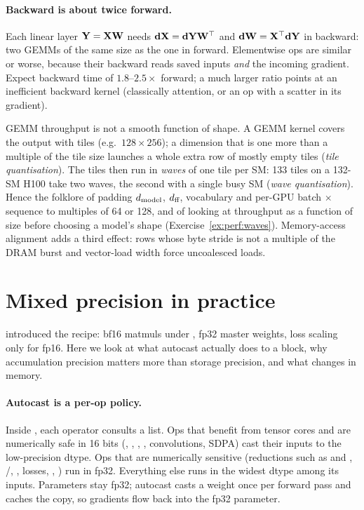 \paragraph{Backward is about twice forward.} Each linear layer $\mathbf{Y}=\mathbf{X}\mathbf{W}$ needs
$\mathbf{dX}=\mathbf{dY}\mathbf{W}^\top$ and $\mathbf{dW}=\mathbf{X}^\top\mathbf{dY}$ in backward: two GEMMs of the
same size as the one in forward. Elementwise ops are similar or worse, because their backward
reads saved inputs \emph{and} the incoming gradient. Expect backward time of
$1.8$--$2.5\times$ forward; a much larger ratio points at an inefficient backward kernel (classically
attention, or an op with a scatter in its gradient).

\begin{systemslens}
GEMM throughput is not a smooth function of shape. A GEMM kernel covers the output with tiles
(e.g.\ $128\times256$); a dimension that is one more than a multiple of the tile size launches a
whole extra row of mostly empty tiles (\emph{tile quantisation}). The tiles then run in
\emph{waves} of one tile per SM: 133 tiles on a 132-SM H100 take two waves, the second with a
single busy SM (\emph{wave quantisation}). Hence the folklore of padding $d_{\text{model}}$, $d_{\text{ff}}$,
vocabulary and per-GPU batch $\times$ sequence to multiples of 64 or 128, and of looking at
throughput as a function of size before choosing a model's shape (Exercise~\ref{ex:perf:waves}).
Memory-access alignment adds a third effect: rows whose byte stride is not a multiple of the
DRAM burst and vector-load width force uncoalesced loads.
\end{systemslens}

\section{Mixed precision in practice}\label{sec:perf:amp}

 introduced the recipe: bf16 matmuls under ,
fp32 master weights, loss scaling only for fp16. Here we look at what autocast actually does to
a block, why accumulation precision matters more than storage precision, and what changes in
memory.

\paragraph{Autocast is a per-op policy.} Inside , each
operator consults a list. Ops that benefit from tensor cores and are numerically safe in 16 bits
(, , , , convolutions, SDPA) cast their inputs to the
low-precision dtype. Ops that are numerically sensitive (reductions such as  and
, /, , losses, ,
) run in fp32. Everything else runs in the widest dtype among its inputs. Parameters
stay fp32; autocast casts a weight once per forward pass and caches the copy, so gradients flow
back into the fp32 parameter.

